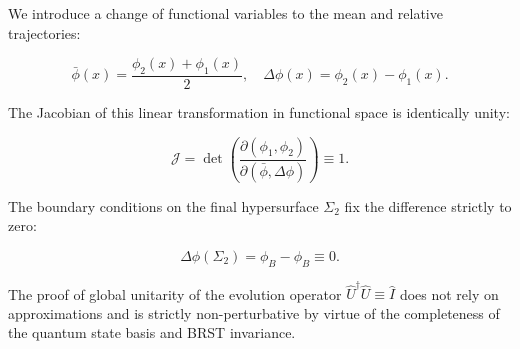 \documentclass[11pt,a4paper]{article}
\theoremstyle{definition}
\begin{document}
We introduce a change of functional variables to the mean and relative trajectories:

\begin{equation}\label{eq:1.81}\tag{1.81}
\bar{\phi}(x) = \frac{\phi_2(x) + \phi_1(x)}{2}, \quad \Delta\phi(x) = \phi_2(x) - \phi_1(x).
\end{equation}

The Jacobian of this linear transformation in functional space is identically unity:

\begin{equation}\label{eq:1.82}\tag{1.82}
\mathcal{J} = \det\left( \frac{\partial(\phi_1, \phi_2)}{\partial(\bar{\phi}, \Delta\phi)} \right) \equiv 1.
\end{equation}

The boundary conditions on the final hypersurface $\Sigma_2$ fix the difference strictly to zero:

\begin{equation}\label{eq:1.83}\tag{1.83}
\Delta\phi(\Sigma_2) = \phi_B - \phi_B \equiv 0.
\end{equation}

The proof of global unitarity of the evolution operator $\hat{U}^\dagger \hat{U} \equiv \hat{I}$ does not rely on approximations and is strictly non-perturbative by virtue of the completeness of the quantum state basis and BRST invariance.
\end{document}
